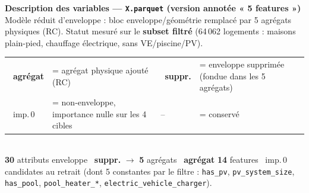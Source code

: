\documentclass[a4paper,landscape]{article}
\newcommand{\var}[1]{\texttt{\small #1}}
\newcommand{\Xsup}{\textcolor{red!75!black}{\ding{51}~\textbf{\footnotesize suppr.}}}   %
\newcommand{\Ozero}{\textcolor{orange!90!black}{\ding{51}~\footnotesize imp.\,0}}         %
\newcommand{\Keep}{\textcolor{black!40}{\footnotesize --}}                                %
\newcommand{\Newagg}{\textcolor{hagg}{\ding{72}~\textbf{\footnotesize agrégat}}}          %
\begin{document}
\footnotesize

\begin{center}
{\Large\bfseries Description des variables — \texttt{X.parquet} (version annotée « 5 features »)}\\[4pt]
{\small Modèle réduit d'enveloppe : bloc enveloppe/géométrie remplacé par 5 agrégats physiques (RC).
Statut mesuré sur le \textbf{subset filtré} (64\,062 logements : maisons plain-pied, chauffage électrique, sans VE/piscine/PV).}
\end{center}

\vspace{2pt}

\begin{center}
\small
\setlength{\tabcolsep}{10pt}
\begin{tabular}{llll}
\Newagg & = agrégat physique ajouté (RC) &
\Xsup   & = enveloppe supprimée (fondue dans les 5 agrégats)\\
\Ozero  & = non-enveloppe, importance nulle sur les 4 cibles &
\Keep   & = conservé\\
\end{tabular}\\[3pt]
{\footnotesize \textbf{30} attributs enveloppe \Xsup{} $\rightarrow$ \textbf{5} agrégats \Newagg{}\quad\textbullet\quad
\textbf{14} features \Ozero{} candidates au retrait (dont 5 constantes par le filtre : \var{has\_pv}, \var{pv\_system\_size}, \var{has\_pool}, \var{pool\_heater\_*}, \var{electric\_vehicle\_charger}).}
\end{center}

\vspace{4pt}
\end{document}
